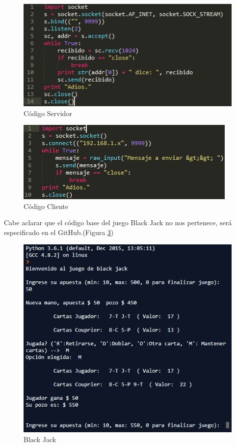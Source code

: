 \documentclass{article}
\begin{document}
\begin{figure}[h!]
\centering
\includegraphics[scale=0.7]{server.png}
\caption{Código Servidor}
\label{fig:serv}
\end{figure}

\begin{figure}[h!]
\centering
\includegraphics[scale=0.7]{client.png}
\caption{Código Cliente}
\label{fig:client}
\end{figure}

Cabe aclarar que el código base del juego Black Jack no nos pertenece, será especificado en el GitHub.(Figura \ref{fig:bj})
\newpage
\begin{figure}[h!]
\centering
\includegraphics[scale=0.7]{Blackj.png}
\caption{Black Jack}
\label{fig:bj}
\end{figure}
\end{document}
